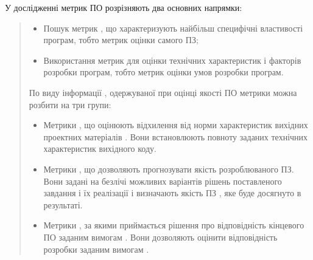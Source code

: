 У дослідженні метрик ПО розрізняють два основних напрямки:
\begin{quote}
\begin{itemize}
\item {} 
Пошук метрик , що характеризують найбільш специфічні властивості програм, тобто метрик оцінки самого ПЗ;

\item {} 
Використання метрик для оцінки технічних характеристик і факторів розробки програм, тобто метрик оцінки умов розробки програм.

\end{itemize}

По виду інформації , одержуваної при оцінці якості ПО метрики можна розбити на три групи:
\begin{itemize}
\item {} 
Метрики , що оцінюють відхилення від норми характеристик вихідних проектних матеріалів . Вони встановлюють повноту заданих технічних характеристик вихідного коду.

\item {} 
Метрики , що дозволяють прогнозувати якість розроблюваного ПЗ. Вони задані на безлічі можливих варіантів рішень поставленого завдання і їх реалізації і визначають якість ПЗ , яке буде досягнуто в результаті.

\item {} 
Метрики , за якими приймається рішення про відповідність кінцевого ПО заданим вимогам . Вони дозволяють оцінити відповідність розробки заданим вимогам .

\end{itemize}
\end{quote}


